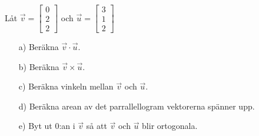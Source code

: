 Låt $\vec{v}=\begin{bmatrix}0\\2\\2\end{bmatrix}$ och $\vec{u}=\begin{bmatrix}3\\1\\2\end{bmatrix}$
\begin{itemize}
\item[a) ] Beräkna $\vec{v}\cdot\vec{u}$.
\item[b) ] Beräkna $\vec{v}\times\vec{u}$.
\item[c) ] Beräkna vinkeln mellan $\vec{v}$ och $\vec{u}$.
\item[d) ] Beräkna arean av det parrallellogram vektorerna spänner upp.
\item[e) ] Byt ut 0:an i $\vec{v}$ så att $\vec{v}$ och $\vec{u}$ blir ortogonala.
\end{itemize}